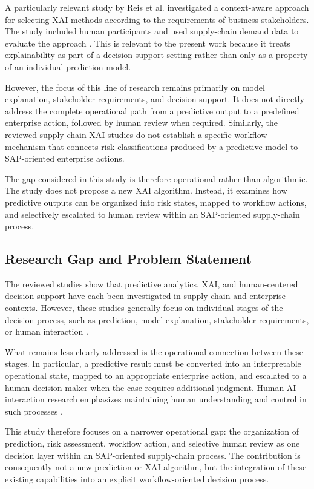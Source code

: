 \documentclass[manuscript, screen, review]{acmart}
\begin{document}
A particularly relevant study by Reis et al. investigated a
context-aware approach for selecting XAI methods according to the
requirements of business stakeholders. The study included human
participants and used supply-chain demand data to evaluate the
approach \cite{reis2025contextxai}. This is relevant to the present
work because it treats explainability as part of a decision-support
setting rather than only as a property of an individual prediction
model.

However, the focus of this line of research remains primarily on
model explanation, stakeholder requirements, and decision support.
It does not directly address the complete operational path from a
predictive output to a predefined enterprise action, followed by
human review when required. Similarly, the reviewed supply-chain XAI
studies do not establish a specific workflow mechanism that connects
risk classifications produced by a predictive model to SAP-oriented
enterprise actions.

The gap considered in this study is therefore operational rather than
algorithmic. The study does not propose a new XAI algorithm. Instead,
it examines how predictive outputs can be organized into risk states,
mapped to workflow actions, and selectively escalated to human
review within an SAP-oriented supply-chain process.
\subsection{Research Gap and Problem Statement}

The reviewed studies show that predictive analytics, XAI, and human-centered decision support have each been investigated in supply-chain and enterprise contexts. However, these studies generally focus on individual stages of the decision process, such as prediction, model explanation, stakeholder requirements, or human interaction \cite{kostopoulos2024xai_dss,fanfani2026human_dss,olan2024xai_supplychain,kosasih2024xai_supplychain,reis2025contextxai}.

What remains less clearly addressed is the operational connection between these stages. In particular, a predictive result must be converted into an interpretable operational state, mapped to an appropriate enterprise action, and escalated to a human decision-maker when the case requires additional judgment. Human-AI interaction research emphasizes maintaining human understanding and control in such processes \cite{amershi2019guidelines}.

This study therefore focuses on a narrower operational gap: the organization of prediction, risk assessment, workflow action, and selective human review as one decision layer within an SAP-oriented supply-chain process. The contribution is consequently not a new prediction or XAI algorithm, but the integration of these existing capabilities into an explicit workflow-oriented decision process.
\end{document}
